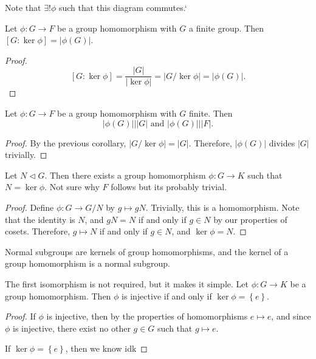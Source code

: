 Note that $\exists !\phi $ such that this diagram commutes.`
\begin{corollary}
	Let $\phi : G \to F$ be a group homomorphism with $G$ a finite group. Then $\left[ G : \ker \phi  \right] =\left| \phi (G) \right| $.
\end{corollary}
\begin{proof}
	\[
		\left[ G : \ker \phi  \right] =\frac{\left| G \right| }{\left| \ker \phi  \right| }=\left| G / \ker \phi  \right| =\left| \phi (G) \right| 
	.\]
\end{proof}
\begin{corollary}
	Let $\phi : G \to F$ be a group homomorphism with $G$ finite. Then
	\[
		\left| \phi (G) \right| |\left| G \right| \text{ and }\left| \phi (G) \right| |\left| F \right| 
	.\]
\end{corollary}
\begin{proof}
	By the previous corollary, $\left| G / \ker \phi  \right| =\left| G \right| $. Therefore, $\left| \phi (G) \right| $ divides $\left| G \right| $ trivially.
\end{proof}
\begin{corollary}
	Let $N\triangleleft G$. Then there exists a group homomorphism $\phi : G \to K$ such that $N=\ker \phi $. Not sure why $F$ follows but its probably trivial.
\end{corollary}
\begin{proof}
	Define $\phi : G \to G / N$ by $g\mapsto gN$. Trivially, this is a homomorphism. Note that the identity is $N$, and $gN=N$ if and only if $g\in N$ by our properties of cosets. Therefore, $g\mapsto N$ if and only if $g\in N$,  and $\ker \phi =N$.
\end{proof}
\begin{remark}
	Normal subgroups are kernels of group homomorphisms, and the kernel of a group homomorphism is a normal subgroup.
\end{remark}
\begin{corollary}
	The first isomorphism is not required, but it makes it simple. Let $\phi : G \to K$ be a group homomorphism. Then $\phi $ is injective if and only if $\ker \phi =\left\{ e \right\} $.
\end{corollary}
\begin{proof}
	If $\phi $ is injective, then by the properties of homomorphisms $e\mapsto e$, and since $\phi $ is injective, there exist no other $g\in G$ such that $g\mapsto e$.

	If $\ker \phi =\left\{ e \right\} $, then we know idk
\end{proof}
